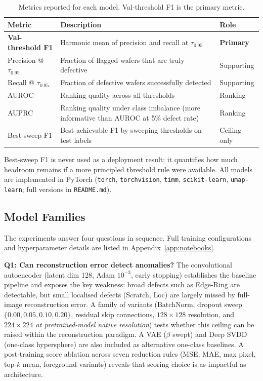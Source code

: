 \documentclass[11pt]{article}
\begin{document}
\begin{table}[H]
\centering
\caption{Metrics reported for each model. Val-threshold F1 is the primary metric.}
\label{tab:metrics}
\begin{tabularx}{\linewidth}{>{\raggedright\arraybackslash}p{3.2cm}
                              >{\raggedright\arraybackslash}X
                              >{\raggedright\arraybackslash}p{2cm}}
\toprule
Metric & Description & Role \\
\midrule
\textbf{Val-threshold F1} & Harmonic mean of precision and recall at $\tau_{0.95}$ & \textbf{Primary} \\
Precision @ $\tau_{0.95}$ & Fraction of flagged wafers that are truly defective & Supporting \\
Recall @ $\tau_{0.95}$ & Fraction of defective wafers successfully detected & Supporting \\
AUROC & Ranking quality across all thresholds & Ranking \\
AUPRC & Ranking quality under class imbalance (more informative than AUROC at 5\% defect rate) & Ranking \\
Best-sweep F1 & Best achievable F1 by sweeping thresholds on test labels & Ceiling only \\
\bottomrule
\end{tabularx}
\end{table}

Best-sweep F1 is never used as a deployment result; it quantifies how much
headroom remains if a more principled threshold rule were available. All models
are implemented in PyTorch (\texttt{torch}, \texttt{torchvision}, \texttt{timm},
\texttt{scikit-learn}, \texttt{umap-learn}; full versions in \texttt{README.md}).

\subsection{Model Families}

The experiments answer four questions in sequence. Full training configurations
and hyperparameter details are listed in Appendix~\ref{app:notebooks}.

\textbf{Q1: Can reconstruction error detect anomalies?} The convolutional
autoencoder (latent dim 128, Adam $10^{-3}$, early stopping) establishes the
baseline pipeline and exposes the key weakness: broad defects such as Edge-Ring
are detectable, but small localised defects (Scratch, Loc) are largely missed
by full-image reconstruction error. A family of variants (BatchNorm, dropout
sweep $\{0.00, 0.05, 0.10, 0.20\}$, residual skip connections, $128\!\times\!128$
resolution, and \emph{$224\!\times\!224$ at pretrained-model native resolution})
tests whether this ceiling can be raised within the reconstruction paradigm.
A VAE ($\beta$ swept) and Deep SVDD (one-class hypersphere) are also included
as alternative one-class baselines. A post-training score ablation across seven
reduction rules (MSE, MAE, max pixel, top-$k$ mean, foreground variants) reveals
that scoring choice is as impactful as architecture.
\end{document}
